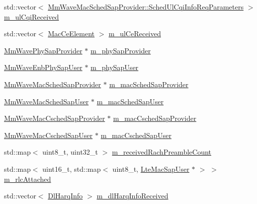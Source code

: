 \begin{DoxyCompactItemize}
\item 
std\+::vector$<$ \hyperlink{structns3_1_1MmWaveMacSchedSapProvider_1_1SchedUlCqiInfoReqParameters}{Mm\+Wave\+Mac\+Sched\+Sap\+Provider\+::\+Sched\+Ul\+Cqi\+Info\+Req\+Parameters} $>$ \hyperlink{classns3_1_1MmWaveEnbMac_aaea2d5b20bbd7a5827bebd0c6b782e7c}{m\+\_\+ul\+Cqi\+Received}
\item 
std\+::vector$<$ \hyperlink{structns3_1_1MacCeElement}{Mac\+Ce\+Element} $>$ \hyperlink{classns3_1_1MmWaveEnbMac_a7046f8a9936884f8d38e139a33db01a4}{m\+\_\+ul\+Ce\+Received}
\item 
\hyperlink{classns3_1_1MmWavePhySapProvider}{Mm\+Wave\+Phy\+Sap\+Provider} $\ast$ \hyperlink{classns3_1_1MmWaveEnbMac_a0bfb3ea8d3d00e3c92ac3a554602d40b}{m\+\_\+phy\+Sap\+Provider}
\item 
\hyperlink{classns3_1_1MmWaveEnbPhySapUser}{Mm\+Wave\+Enb\+Phy\+Sap\+User} $\ast$ \hyperlink{classns3_1_1MmWaveEnbMac_a8a8e841cfda9219141cc3265fe6e85d8}{m\+\_\+phy\+Sap\+User}
\item 
\hyperlink{classns3_1_1MmWaveMacSchedSapProvider}{Mm\+Wave\+Mac\+Sched\+Sap\+Provider} $\ast$ \hyperlink{classns3_1_1MmWaveEnbMac_a3df504a631404f94bee271abdca7bd88}{m\+\_\+mac\+Sched\+Sap\+Provider}
\item 
\hyperlink{classns3_1_1MmWaveMacSchedSapUser}{Mm\+Wave\+Mac\+Sched\+Sap\+User} $\ast$ \hyperlink{classns3_1_1MmWaveEnbMac_a6ae0d0026ee9f09e490df54faafef951}{m\+\_\+mac\+Sched\+Sap\+User}
\item 
\hyperlink{classns3_1_1MmWaveMacCschedSapProvider}{Mm\+Wave\+Mac\+Csched\+Sap\+Provider} $\ast$ \hyperlink{classns3_1_1MmWaveEnbMac_a2a5b4d485b804ee199f04494f6645e55}{m\+\_\+mac\+Csched\+Sap\+Provider}
\item 
\hyperlink{classns3_1_1MmWaveMacCschedSapUser}{Mm\+Wave\+Mac\+Csched\+Sap\+User} $\ast$ \hyperlink{classns3_1_1MmWaveEnbMac_a39a340844500b1b5f07c82e198627fd9}{m\+\_\+mac\+Csched\+Sap\+User}
\item 
std\+::map$<$ uint8\+\_\+t, uint32\+\_\+t $>$ \hyperlink{classns3_1_1MmWaveEnbMac_a2ef0d45938569968890f005676fcdf95}{m\+\_\+received\+Rach\+Preamble\+Count}
\item 
std\+::map$<$ uint16\+\_\+t, std\+::map$<$ uint8\+\_\+t, \hyperlink{classns3_1_1LteMacSapUser}{Lte\+Mac\+Sap\+User} $\ast$ $>$ $>$ \hyperlink{classns3_1_1MmWaveEnbMac_a13e4bafd30f3edae1f5dc1192c9b3011}{m\+\_\+rlc\+Attached}
\item 
std\+::vector$<$ \hyperlink{structns3_1_1DlHarqInfo}{Dl\+Harq\+Info} $>$ \hyperlink{classns3_1_1MmWaveEnbMac_accfe25fdd9a18c09dd39a062e02370e5}{m\+\_\+dl\+Harq\+Info\+Received}

\end{DoxyCompactItemize}
